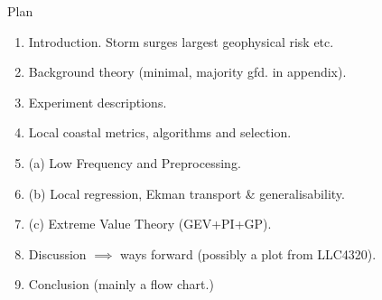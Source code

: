 \begin{frame}{Plan}
\begin{enumerate}
\item Introduction. Storm surges largest geophysical risk etc.
\item Background theory (minimal, majority gfd. in appendix).
\item Experiment descriptions.
\item Local coastal metrics, algorithms and selection.
\item (a) Low Frequency and Preprocessing.
\item (b) Local regression, Ekman transport \& generalisability.
\item (c) Extreme Value Theory (GEV+PI+GP).
\item Discussion $\implies$ ways forward (possibly a plot from LLC4320).
\item Conclusion (mainly a flow chart.)
\end{enumerate}
\end{frame}
